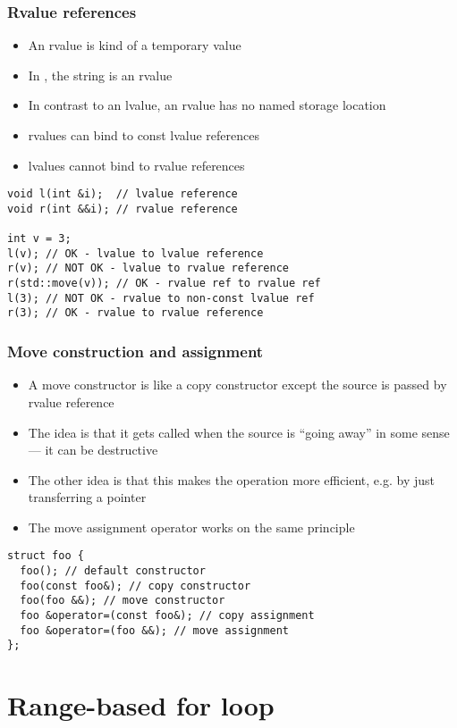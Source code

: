 \documentclass[aspectratio=1610]{beamer}
\begin{document}
\begin{frame}[fragile]
  \frametitle{Rvalue references}
  \begin{itemize}
  \item An \alert{rvalue} is kind of a temporary value
  \item In , the string is an rvalue
  \item In contrast to an lvalue, an rvalue has no named storage location
  \item rvalues can bind to const lvalue references
  \item lvalues cannot bind to rvalue references
  \end{itemize}
\begin{verbatim}
void l(int &i);  // lvalue reference
void r(int &&i); // rvalue reference

int v = 3;
l(v); // OK - lvalue to lvalue reference
r(v); // NOT OK - lvalue to rvalue reference
r(std::move(v)); // OK - rvalue ref to rvalue ref
l(3); // NOT OK - rvalue to non-const lvalue ref
r(3); // OK - rvalue to rvalue reference
\end{verbatim}
\end{frame}

\begin{frame}[fragile]
  \frametitle{Move construction and assignment}
  \begin{itemize}
  \item A \alert{move constructor} is like a copy constructor except the source
    is passed by rvalue reference
  \item The idea is that it gets called when the source is ``going away'' in
    some sense --- it can be destructive
  \item The other idea is that this makes the operation more efficient, e.g. by
    just transferring a pointer
  \item The \alert{move assignment operator} works on the same principle
  \end{itemize}
\begin{verbatim}
struct foo {
  foo(); // default constructor
  foo(const foo&); // copy constructor
  foo(foo &&); // move constructor
  foo &operator=(const foo&); // copy assignment
  foo &operator=(foo &&); // move assignment
};
\end{verbatim}
\end{frame}

\section{Range-based for loop}
\end{document}
